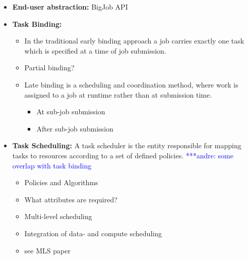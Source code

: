 \documentclass[]{article}
\newcommand{\alnote}[1]{ {\textcolor{blue} { ***andre: #1 }}}
\newcommand{\alnote}[1]{}
\begin{document}
\begin{itemize}
	\item \textbf{End-user abstraction:} BigJob API
	\item \textbf{Task Binding:~\cite{diane-thesis}} 
		\begin{itemize}
			\item In the traditional early binding approach a job carries
			 exactly one task which is specified at a time of job submission.
			 \item Partial binding?
			\item Late binding is a scheduling and coordination
			 method, where work is assigned to a job at runtime rather than at
			 submission time.
			\begin{itemize}
				\item At sub-job submission 
				\item After sub-job submission
			\end{itemize}
	\end{itemize}
	\item \textbf{Task Scheduling:} A task scheduler is the entity 
	responsible for mapping tasks to resources according to a set of defined 
	policies. \alnote{some overlap with task binding}
	\begin{itemize}
	 			\item Policies and Algorithms
	 			\item What attributes are required?
	 			\item Multi-level scheduling
	 			\item Integration of data- and compute scheduling
	 			\item see MLS paper
	\end{itemize}

\end{itemize}
\end{document}
